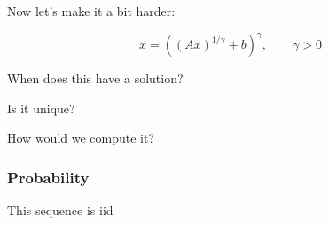 \begin{frame}
    
    Now let's make it a bit harder:

    \begin{equation*}
        x = ((Ax)^{1/\gamma} + b)^\gamma,
        \qquad \gamma > 0
    \end{equation*}


    \vspace{0.5em}
    \vspace{0.5em}

    When does this have a solution?
    \vspace{0.5em}

    Is it unique?
    \vspace{0.5em}

    How would we compute it?

\end{frame}


\begin{frame}
    \frametitle{Probability}

    This sequence is {\sc iid}


    \begin{figure}
       \begin{center}
       \end{center}
    \end{figure}

\end{frame}



